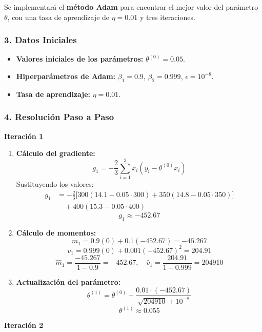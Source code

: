 \documentclass[a5paper]{article}
\begin{document}
	Se implementará el \textbf{método Adam} para encontrar el mejor valor del parámetro \( \theta \), con una tasa de aprendizaje de \( \eta = 0.01 \) y tres iteraciones.
	
	\subsubsection*{3. Datos Iniciales}
	
	\begin{itemize}
		\item \textbf{Valores iniciales de los parámetros:} \( \theta^{(0)} = 0.05 \).
		\item \textbf{Hiperparámetros de Adam:} \( \beta_1 = 0.9 \), \( \beta_2 = 0.999 \), \( \epsilon = 10^{-8} \).
		\item \textbf{Tasa de aprendizaje:} \( \eta = 0.01 \).
	\end{itemize}
	
	\subsubsection*{4. Resolución Paso a Paso}
	
	\textbf{Iteración 1}
	
	\begin{enumerate}
		\item \textbf{Cálculo del gradiente:}
		\[
		g_1 = -\frac{2}{3} \sum_{i=1}^{3} x_i (y_i - \theta^{(0)} x_i)
		\]
		Sustituyendo los valores:
		\begin{align*}
			g_1 &= -\frac{2}{3} \Bigg[ 300(14.1 - 0.05 \cdot 300) + 350(14.8 - 0.05 \cdot 350) \Bigg] \\
			&\quad + 400(15.3 - 0.05 \cdot 400)
		\end{align*}	
		\[
		g_1 \approx -452.67
		\]
		
		\item \textbf{Cálculo de momentos:}
		\[
		m_1 = 0.9(0) + 0.1(-452.67) = -45.267
		\]
		\[
		v_1 = 0.999(0) + 0.001(-452.67)^2 = 204.91
		\]
		\[
		\hat{m}_1 = \frac{-45.267}{1 - 0.9} = -452.67, \quad \hat{v}_1 = \frac{204.91}{1 - 0.999} = 204910
		\]
		
		\item \textbf{Actualización del parámetro:}
		\[
		\theta^{(1)} = \theta^{(0)} - \frac{0.01 \cdot (-452.67)}{\sqrt{204910} + 10^{-8}}
		\]
		\[
		\theta^{(1)} \approx 0.055
		\]
	\end{enumerate}
	
	\textbf{Iteración 2}
	
\end{document}
